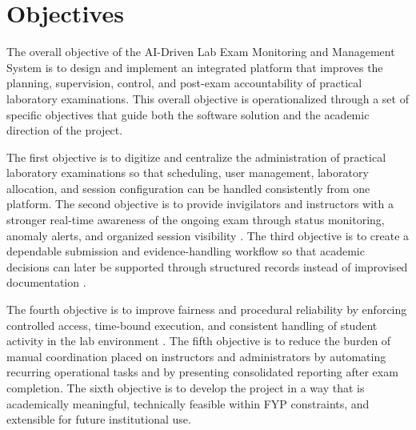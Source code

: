 \section{Objectives}

The overall objective of the AI-Driven Lab Exam Monitoring and Management System is to design and implement an integrated platform that improves the planning, supervision, control, and post-exam accountability of practical laboratory examinations. This overall objective is operationalized through a set of specific objectives that guide both the software solution and the academic direction of the project.

The first objective is to digitize and centralize the administration of practical laboratory examinations so that scheduling, user management, laboratory allocation, and session configuration can be handled consistently from one platform. The second objective is to provide invigilators and instructors with a stronger real-time awareness of the ongoing exam through status monitoring, anomaly alerts, and organized session visibility \cite{pmc_cbt}. The third objective is to create a dependable submission and evidence-handling workflow so that academic decisions can later be supported through structured records instead of improvised documentation \cite{integ1}.

The fourth objective is to improve fairness and procedural reliability by enforcing controlled access, time-bound execution, and consistent handling of student activity in the lab environment \cite{rbac1}. The fifth objective is to reduce the burden of manual coordination placed on instructors and administrators by automating recurring operational tasks and by presenting consolidated reporting after exam completion. The sixth objective is to develop the project in a way that is academically meaningful, technically feasible within FYP constraints, and extensible for future institutional use.

